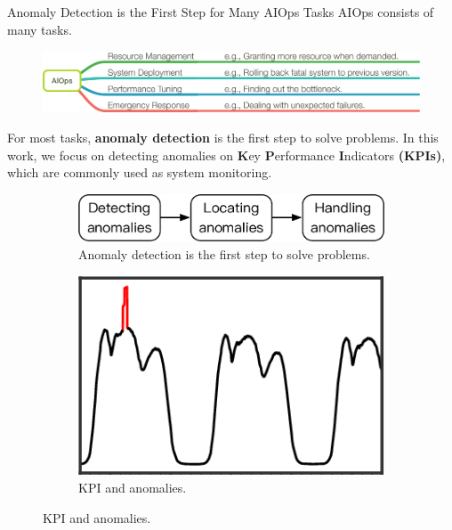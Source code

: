 \documentclass[usenames,dvipsnames]{beamer}
\newcommand{\emphasis}[1]{\textbf{\textcolor{emphcolor}{#1}}}
\begin{document}
\begin{frame}{Anomaly Detection is the First Step for Many AIOps Tasks}
  AIOps consists of many tasks.

  \begin{figure}
  	\includegraphics[height=0.21\textheight]{aiops}
  \end{figure}
  
  For most tasks, \emphasis{anomaly detection} is the first step to solve problems.
  In this work, we focus on detecting anomalies on \emphasis{K}ey \emphasis{P}erformance \emphasis{I}ndicators \emphasis{(KPIs)}, which are commonly used as system monitoring.

  \vspace{1em}
  \begin{minipage}{\linewidth}
    \centering
    \begin{figure}
      \begin{subfigure}{0.7\linewidth}
  	    \centering
        \includegraphics[height=0.14\textheight]{aiops-stages}
        \caption{\footnotesize Anomaly detection is the first step to solve problems.}
      \end{subfigure}\hfill
  	  \begin{subfigure}{0.29\linewidth}
  	    \centering
        \includegraphics[height=0.14\textheight]{business-kpi}
        \caption{\footnotesize KPI and anomalies.}
      \end{subfigure}
    \end{figure}
  \end{minipage}
\end{frame}
\end{document}

